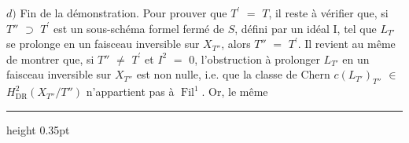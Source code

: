 \documentclass[9pt]{article}
\newcommand{\CanonText}[1]{\par{\fontsize{8.0}{9.35}\selectfont\RaggedRight #1\par}\vspace{2.2pt}}
\begin{document}
\begin{minipage}[t][\dimexpr\textheight-5pt\relax][t]{\textwidth}
\CanonText{\(d)\) Fin de la démonstration. Pour prouver que \(T^{\prime}\) \(=\) \(T\), il reste à vérifier que, si \(T''\) \(\supset{}\) \(T^{\prime}\) est un sous-schéma formel fermé de \(S\), défini par un idéal I, tel que \(L_{T'}\) se prolonge en un faisceau inversible sur \(X_{T''}\), alors \(T''\) \(=\) \(T^{\prime}\). Il revient au même de montrer que, si \(T''\) \(\neq{}\) \(T^{\prime}\) et \(I^{2}\) \(=\) 0, l'obstruction à prolonger \(L_{T'}\) en un faisceau inversible sur \(X_{T''}\) est non nulle, i.e. que la classe de Chern \(c(L_{T'})_{T''}\) \(\in{}\) \(H^{2}_{\mathrm{DR}}(X_{T''}/T'')\) n'appartient pas à \(\operatorname{Fil}^{1}\). Or, le même}
\vfill
{\color{Accent}\hrule height 0.35pt}\vspace{3pt}
\end{minipage}
\newpage
\end{document}
